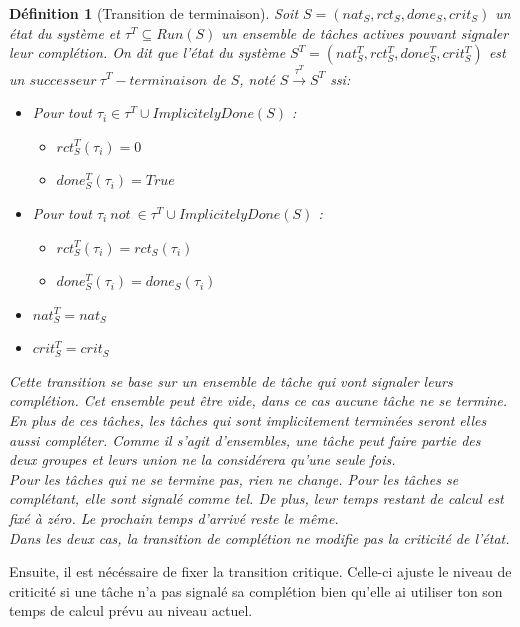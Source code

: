 \documentclass[12pt,a4paper,oneside]{book}
\theoremstyle{break}
\newtheorem{defin}{Définition}[chapter]
\theoremstyle{breakplain}
\begin{document}
\begin{defin}[Transition de terminaison]
\label{spo:tterm}
Soit $S = (nat_S, rct_S, done_S, crit_S)$ un état du système et $\tau^T \subseteq Run(S)$ un ensemble de tâches actives pouvant signaler leur complétion. On dit que l'état du système $S^T = (nat_S^T, rct_S^T, done_S^T, crit_S^T)$ est un $successeur\ \tau^T-terminaison$ de $S$, noté $S\xrightarrow{\tau^T}S^T$ ssi:
\begin{itemize}
\item Pour tout $\tau_i \in \tau^T \cup ImplicitelyDone(S)$ :\begin{itemize}
\item $rct_{S}^T(\tau_i) = 0$
\item $done_{S}^T(\tau_i) = True$
\end{itemize}

\item Pour tout $\tau_i\ not\ \in \tau^T \cup ImplicitelyDone(S)$ :\begin{itemize}
\item $rct_{S}^T(\tau_i) = rct_{S}(\tau_i)$
\item $done_{S}^T(\tau_i) = done_{S}(\tau_i)$
\end{itemize}
\item $nat_{S}^T = nat_{S}$
\item $crit_{S}^T = crit_{S}$

\end{itemize}
Cette transition se base sur un ensemble de tâche qui vont signaler leurs complétion. Cet ensemble peut être vide, dans ce cas aucune tâche ne se termine. En plus de ces tâches, les tâches qui sont implicitement terminées seront elles aussi compléter. Comme il s'agit d'ensembles, une tâche peut faire partie des deux groupes et leurs union ne la considérera qu'une seule fois.\\

Pour les tâches qui ne se termine pas, rien ne change. Pour les tâches se complétant, elle sont signalé comme tel. De plus, leur temps restant de calcul est fixé à zéro. Le prochain temps d'arrivé reste le même.\\
Dans les deux cas, la transition de complétion ne modifie pas la criticité de l'état.
\end{defin}

Ensuite, il est nécéssaire de fixer la transition critique. Celle-ci ajuste le niveau de criticité si une tâche n'a pas signalé sa complétion bien qu'elle ai utiliser ton son temps de calcul prévu au niveau actuel.
\end{document}
